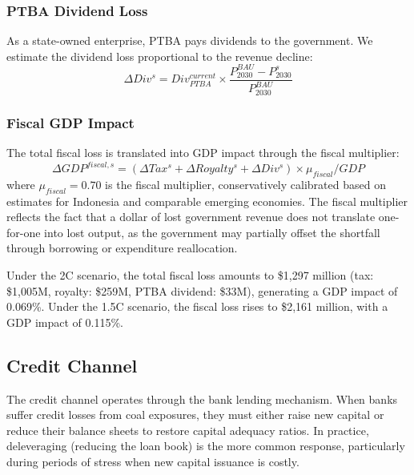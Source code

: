 \subsubsection{PTBA Dividend Loss}

As a state-owned enterprise, PTBA pays dividends to the government. We estimate the dividend loss proportional to the revenue decline:
\begin{equation}
\label{eq:dividend_loss}
\Delta Div^s = Div^{current}_{PTBA} \times \frac{P^{BAU}_{2030} - P^s_{2030}}{P^{BAU}_{2030}}
\end{equation}

\subsubsection{Fiscal GDP Impact}

The total fiscal loss is translated into GDP impact through the fiscal multiplier:
\begin{equation}
\label{eq:fiscal_gdp}
\Delta GDP^{fiscal,s} = \left(\Delta Tax^s + \Delta Royalty^s + \Delta Div^s\right) \times \mu_{fiscal} / GDP
\end{equation}
where $\mu_{fiscal} = 0.70$ is the fiscal multiplier, conservatively calibrated based on estimates for Indonesia and comparable emerging economies. The fiscal multiplier reflects the fact that a dollar of lost government revenue does not translate one-for-one into lost output, as the government may partially offset the shortfall through borrowing or expenditure reallocation.

Under the 2\textdegree C scenario, the total fiscal loss amounts to \$1,297 million (tax: \$1,005M, royalty: \$259M, PTBA dividend: \$33M), generating a GDP impact of 0.069\%. Under the 1.5\textdegree C scenario, the fiscal loss rises to \$2,161 million, with a GDP impact of 0.115\%.

\subsection{Credit Channel}
\label{subsec:credit_channel}

The credit channel operates through the bank lending mechanism. When banks suffer credit losses from coal exposures, they must either raise new capital or reduce their balance sheets to restore capital adequacy ratios. In practice, deleveraging (reducing the loan book) is the more common response, particularly during periods of stress when new capital issuance is costly.

